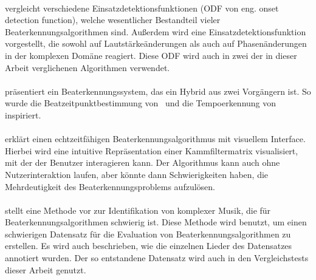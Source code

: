 \paragraph{\cite{2004_BeDaDuSa}}
{
	vergleicht verschiedene Einsatzdetektionsfunktionen (ODF von eng. onset detection function),
		welche wesentlicher Bestandteil vieler Beaterkennungsalgorithmen sind.
	Au{\ss}erdem wird eine Einsatzdetektionsfunktion vorgestellt,
		die sowohl auf Lautstärkeänderungen
		als auch auf Phasenänderungen in der komplexen Domäne
		reagiert.
	Diese ODF wird auch in zwei der in dieser Arbeit verglichenen Algorithmen verwendet.
}

\paragraph{\cite{2009_DaPlSt}}
{
	präsentiert ein Beaterkennungssystem,
		das ein Hybrid aus zwei Vorgängern ist.
	So wurde die Beatzeitpunktbestimmung von~\cite{2007_El}
		und die Tempoerkennung von~\cite{2007_DaPl} inspiriert.
}

\paragraph{\cite{2011_PlRoSt}}
{
	erklärt einen echtzeitfähigen Beaterkennungsalgorithmus mit visuellem Interface.
	Hierbei wird eine intuitive Repräsentation einer Kammfiltermatrix visualisiert,
		mit der der Benutzer interagieren kann.
	Der Algorithmus kann auch ohne Nutzerinteraktion laufen,
		aber könnte dann Schwierigkeiten haben,
		die Mehrdeutigkeit des Beaterkennungsproblems aufzulösen.
}


\paragraph{\cite{2012_HoDaZaOlGo}}
{
	stellt eine Methode vor zur Identifikation von komplexer Musik,
		die für Beaterkennungsalgorithmen schwierig ist.
	Diese Methode wird benutzt,
		um einen schwierigen Datensatz für die Evaluation von Beaterkennungsalgorithmen zu erstellen.
	Es wird auch beschrieben,
		wie die einzelnen Lieder des Datensatzes annotiert wurden.
	Der so entstandene Datensatz wird auch in den Vergleichstests dieser Arbeit genutzt.
}
